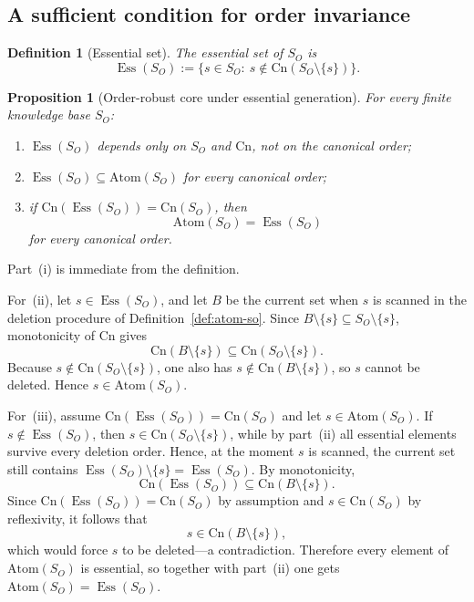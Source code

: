 \documentclass[journal,onecolumn]{IEEEtran}
\makeatletter
\newcommand{\Atom}{\text{Atom}}
\newcommand{\Cn}{\text{Cn}}
\newcommand{\Ess}{\operatorname{Ess}}
\newtheorem{proposition}{Proposition}[section]
\newtheorem{definition}{Definition}[section]
\numberwithin{equation}{section}
\renewenvironment{proof}[1][\proofname]{\par
  \pushQED{\qed}%
  \normalfont \topsep6\p@\@plus6\p@\relax
  \trivlist
  \item[\hskip\labelsep
        \itshape
    #1\@addpunct{.}]\ignorespaces
}{%
  \popQED\endtrivlist\@endpefalse
}
\makeatother
\begin{document}
\subsection{A sufficient condition for order invariance}
\label{app:order-invariance-positive}

\begin{definition}[Essential set]
\label{def:essential-set}
The \emph{essential set} of \(S_O\) is
\[
  \Ess(S_O)
  :=
  \{s\in S_O:\ s\notin \Cn(S_O\setminus\{s\})\}.
\]
\end{definition}

\begin{proposition}[Order-robust core under essential generation]
\label{prop:essential-order-invariance}
For every finite knowledge base \(S_O\):
\begin{enumerate}[label=\textup{(\roman*)}]
  \item \(\Ess(S_O)\) depends only on \(S_O\) and \(\Cn\), not on the
        canonical order;
  \item \(\Ess(S_O)\subseteq \Atom(S_O)\) for every canonical order;
  \item if \(\Cn(\Ess(S_O))=\Cn(S_O)\), then
        \[
          \Atom(S_O)=\Ess(S_O)
        \]
        for every canonical order.
\end{enumerate}
\end{proposition}

\begin{proof}
Part~\textup{(i)} is immediate from the definition.

For~\textup{(ii)}, let \(s\in\Ess(S_O)\), and let \(B\) be the current
set when \(s\) is scanned in the deletion procedure of
Definition~\ref{def:atom-so}.
Since \(B\setminus\{s\}\subseteq S_O\setminus\{s\}\), monotonicity of
\(\Cn\) gives
\[
  \Cn(B\setminus\{s\})
  \subseteq
  \Cn(S_O\setminus\{s\}).
\]
Because \(s\notin\Cn(S_O\setminus\{s\})\), one also has
\(s\notin\Cn(B\setminus\{s\})\), so \(s\) cannot be deleted.
Hence \(s\in\Atom(S_O)\).

For~\textup{(iii)}, assume \(\Cn(\Ess(S_O))=\Cn(S_O)\) and let
\(s\in\Atom(S_O)\).
If \(s\notin\Ess(S_O)\), then
\(s\in\Cn(S_O\setminus\{s\})\), while by part~\textup{(ii)} all
essential elements survive every deletion order.
Hence, at the moment \(s\) is scanned, the current set still contains
\(\Ess(S_O)\setminus\{s\}=\Ess(S_O)\). By monotonicity,
\[
  \Cn(\Ess(S_O))
  \subseteq
  \Cn(B\setminus\{s\}).
\]
Since \(\Cn(\Ess(S_O))=\Cn(S_O)\) by assumption and \(s\in\Cn(S_O)\)
by reflexivity, it follows that
\[
  s\in\Cn(B\setminus\{s\}),
\]
which would force \(s\) to be deleted---a contradiction.
Therefore every element of \(\Atom(S_O)\) is essential, so together
with part~\textup{(ii)} one gets
\(\Atom(S_O)=\Ess(S_O)\).
\end{proof}
\end{document}
